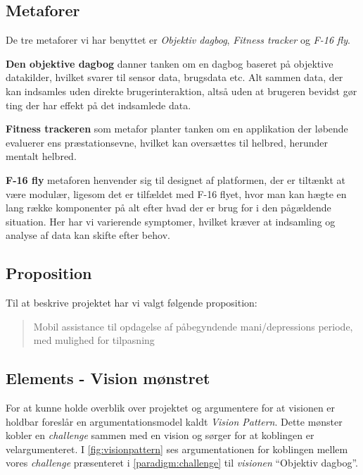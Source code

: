 \subsection{Metaforer}
De tre metaforer vi har benyttet er \textit{Objektiv dagbog}, \textit{Fitness tracker} og \textit{F-16 fly}.

\textbf{Den objektive dagbog} danner tanken om en dagbog baseret på objektive datakilder, hvilket svarer til sensor data, brugsdata etc.
Alt sammen data, der kan indsamles uden direkte brugerinteraktion, altså uden at brugeren bevidst gør ting der har effekt på det indsamlede data.

\textbf{Fitness trackeren} som metafor planter tanken om en applikation der løbende evaluerer ens præstationsevne, hvilket kan oversættes til helbred, herunder mentalt helbred.

\textbf{F-16 fly}\label{vision::fly} metaforen henvender sig til designet af platformen, der er tiltænkt at være modulær, ligesom det er tilfældet med F-16 flyet, hvor man kan hægte en lang række komponenter på alt efter hvad der er brug for i den pågældende situation.
Her har vi varierende symptomer, hvilket kræver at indsamling og analyse af data kan skifte efter behov.

\subsection{Proposition}
Til at beskrive projektet har vi valgt følgende proposition:
\begin{quote}
	Mobil assistance til opdagelse af påbegyndende mani/depressions periode, med mulighed for tilpasning
\end{quote}

\subsection{Elements - Vision mønstret}
For at kunne holde overblik over projektet og argumentere for at visionen er holdbar foreslår \citet[Kapitel 15 - Project]{art:essence} en argumentationsmodel kaldt \emph{Vision Pattern}. 
Dette mønster kobler en \emph{challenge} sammen med en vision og sørger for at koblingen er velargumenteret.
I \cref{fig:visionpattern} ses argumentationen for koblingen mellem vores \textit{challenge} præsenteret i \cref{paradigm:challenge} til \textit{visionen} ``Objektiv dagbog''.

